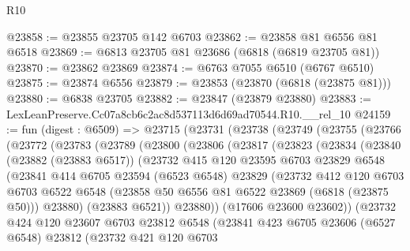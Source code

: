 \begin{lexlean}{R10}
\begin{coremodule}
@23858 := @23855 @23705 @142 @6703
@23862 := @23858 @81 @6556 @81 @6518
@23869 := @6813 @23705 @81 @23686 (@6818 (@6819 @23705 @81))
@23870 := @23862 @23869
@23874 := @6763 @7055 @6510 (@6767 @6510)
@23875 := @23874 @6556
@23879 := @23853 (@23870 (@6818 (@23875 @81)))
@23880 := @6838 @23705
@23882 := @23847 (@23879 @23880)
@23883 := LexLeanPreserve.Cc07a8cb6c2ac8d537113d6d69ad70544.R10.__rel_10
@24159 := fun (digest : @6509) =>
  @23715
    (@23731
      (@23738
        (@23749
          (@23755
            (@23766
              (@23772
                (@23783
                  (@23789
                    (@23800
                      (@23806
                        (@23817
                          (@23823
                            (@23834
                              (@23840
                                (@23882 (@23883 @6517))
                                (@23732
                                  @415
                                  @120
                                  @23595
                                  @6703
                                  @23829
                                  @6548
                                  (@23841
                                    @414
                                    @6705
                                    @23594
                                    (@6523 @6548)
                                    @23829
                                    (@23732
                                      @412
                                      @120
                                      @6703
                                      @6703
                                      @6522
                                      @6548
                                      (@23858 @50 @6556 @81 @6522 @23869 (@6818 (@23875 @50)))
                                      @23880)
                                    (@23883 @6521))
                                  @23880))
                              (@17606 @23600 @23602))
                            (@23732
                              @424
                              @120
                              @23607
                              @6703
                              @23812
                              @6548
                              (@23841
                                @423
                                @6705
                                @23606
                                (@6527 @6548)
                                @23812
                                (@23732
                                  @421
                                  @120
                                  @6703

\end{coremodule}
\end{lexlean}
